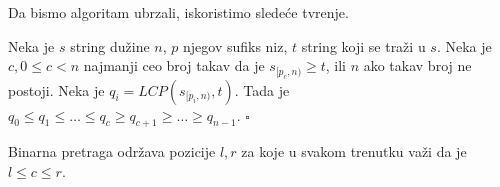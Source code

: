 Da bismo algoritam ubrzali, iskoristimo slede\' ce tvr\dj enje.

\begin{thm}
Neka je $s$ string du\v zine $n$, $p$ njegov sufiks niz, $t$ string koji se tra\v zi u $s$. Neka je $c, 0 \leq c < n$ najmanji ceo broj takav da je $s_{[p_c, n)} \geq t$, ili $n$ ako takav broj ne postoji. Neka je $q_i = LCP(s_{[p_i, n)}, t)$. Tada je $q_0 \leq q_1 \leq \ldots \leq q_c \geq q_{c+1} \geq \ldots \geq q_{n-1}$. \hfill $\square$
\end{thm}

Binarna pretraga odr\v zava pozicije $l,r$ za koje u svakom trenutku va\v zi da je $l \leq c \leq r$.
